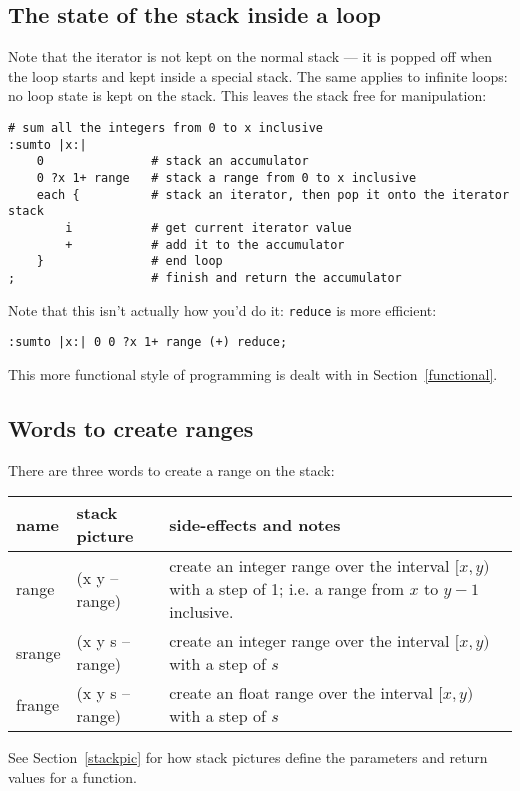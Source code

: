 \clearpage  
\subsection{The state of the stack inside a loop}
Note that the iterator is not kept on the normal stack --- it is popped
off when the loop starts and kept inside a special stack. The same
applies to infinite loops: no loop state is kept on the stack. This 
leaves the stack free for manipulation:
\begin{lstlisting}
# sum all the integers from 0 to x inclusive    
:sumto |x:|
    0               # stack an accumulator
    0 ?x 1+ range   # stack a range from 0 to x inclusive
    each {          # stack an iterator, then pop it onto the iterator stack
        i           # get current iterator value
        +           # add it to the accumulator
    }               # end loop
;                   # finish and return the accumulator
\end{lstlisting}
Note that this isn't actually how you'd do it: \texttt{reduce} is
more efficient:
\begin{lstlisting}
:sumto |x:| 0 0 ?x 1+ range (+) reduce;
\end{lstlisting}
This more functional style of programming is dealt with in
Section~\ref{functional}.

\subsection{Words to create ranges}
There are three words to create a range on the stack:
\begin{center}
\begin{tabular}{|l|l|p{4in}|}\hline
\textbf{name} & \textbf{stack picture} & \textbf{side-effects and notes}\\ \hline
range & (x y -- range) & create an integer range over the interval $[x,y)$ with a step of 1; i.e. a range from $x$ to $y-1$ inclusive.\\
srange & (x y s -- range) &  create an integer range over the interval $[x,y)$ with a step of $s$\\
frange & (x y s -- range) &  create an float range over the interval $[x,y)$ with a step of $s$\\
\hline
\end{tabular}
\end{center}
See Section~\ref{stackpic} for how stack pictures define the parameters
and return values for a function.

